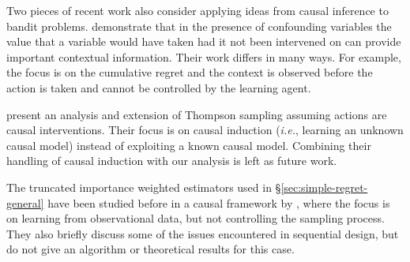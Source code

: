 \documentclass[11pt,a4paper,oneside]{book}
\newcommand{\ie}{\textit{i.e.}}
\newcommand{\bigtheta}[1]{\Theta\left( #1 \right)}
\newcommand{\bigthetatilde}[1]{\tilde{\Theta}\left( #1 \right)}
\newcommand{\bigomega}[1]{\Omega\left( #1 \right)}
\theoremstyle{plain}
\theoremstyle{definition}
\begin{document}

Two pieces of recent work also consider applying ideas from causal inference to bandit problems.
\citet{Bareinboim2015} demonstrate that in the presence of confounding variables the value that a variable would have taken had it not been 
intervened on can provide important contextual information. Their work differs in many ways. For example, the focus is on the cumulative regret and
the context is observed before the action is taken and cannot be controlled by the learning agent.  


 \citet{Ortega2014thompson} present an analysis and extension of Thompson sampling assuming actions are causal interventions. Their focus is on causal induction (\ie, learning an unknown causal model) instead of exploiting a known causal model. Combining their handling of  causal induction with our analysis is left as future work.

The truncated importance weighted estimators used in \S\ref{sec:simple-regret-general} have been studied before in a causal framework by \citet{Bottou2013}, 
where the focus is on learning from observational data, but not controlling the sampling process. They also briefly discuss some of the issues 
encountered in sequential design, but do not give an algorithm or theoretical results for this case.
\end{document}
